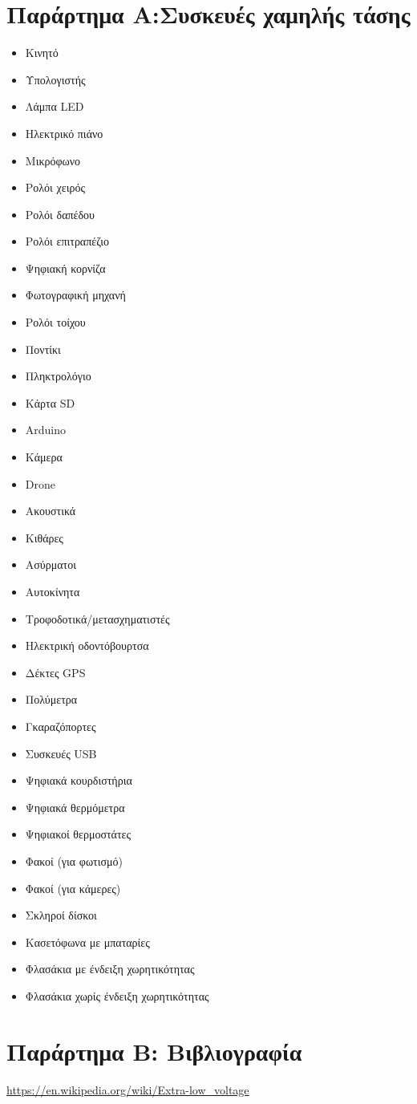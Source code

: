 \documentclass[11pt,a4paper,notitlepage,fleqn]{article}
\begin{document}
\newpage
\section*{Παράρτημα Α:\quad Συσκευές χαμηλής τάσης}
\label{sec:lvd}
\begin{itemize}
	\item Κινητό
	\item Υπολογιστής
	\item Λάμπα LED
	\item Ηλεκτρικό πιάνο
	\item Μικρόφωνο
	\item Ρολόι χειρός
	\item Ρολόι δαπέδου
	\item Ρολόι επιτραπέζιο
	\item Ψηφιακή κορνίζα
	\item Φωτογραφική μηχανή
	\item Ρολόι τοίχου
	\item Ποντίκι
	\item Πληκτρολόγιο
	\item Κάρτα SD
	\item Arduino
	\item Κάμερα
	\item Drone
	\item Ακουστικά
	\item Κιθάρες
	\item Ασύρματοι
	\item Αυτοκίνητα
	\item Τροφοδοτικά/μετασχηματιστές
	\item Ηλεκτρική οδοντόβουρτσα
	\item Δέκτες GPS
	\item Πολύμετρα
	\item Γκαραζόπορτες
	\item Συσκευές USB
	\item Ψηφιακά κουρδιστήρια
	\item Ψηφιακά θερμόμετρα
	\item Ψηφιακοί θερμοστάτες
	\item Φακοί (για φωτισμό)
	\item Φακοί (για κάμερες)
	\item Σκληροί δίσκοι
	\item Κασετόφωνα με μπαταρίες
	\item Φλασάκια με ένδειξη χωρητικότητας
	\item Φλασάκια χωρίς ένδειξη χωρητικότητας
\end{itemize}

\section*{Παράρτημα Β: Βιβλιογραφία}
\url{https://en.wikipedia.org/wiki/Extra-low_voltage}
\end{document}
